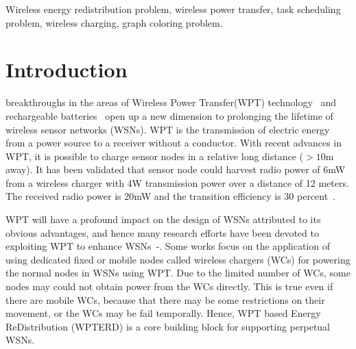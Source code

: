 \documentclass[journal,10pt]{IEEEtran}
\begin{document}
\begin{IEEEkeywords}
Wireless energy redistribution problem, wireless power transfer, task scheduling problem, wireless charging, graph coloring problem.
\end{IEEEkeywords}


\IEEEpeerreviewmaketitle



\section{Introduction}
\label{sec_intro}
\newtheorem{lemma}{\textbf{Lemma}}
\newtheorem{theorem}{\textbf{Theorem}}
\newtheorem{property}{\textbf{P}}
\newtheorem{corollary}{\textbf{Corollary}}
%
%
%
%

 breakthroughs in the areas of Wireless Power Transfer(WPT) technology~\cite{Kurs2007, Cannon2009} and rechargeable batteries~\cite{Kang2006} open up a new dimension to prolonging the lifetime of wireless sensor networks (WSNs). WPT is the transmission of electric energy from a power source to a receiver without a conductor. With recent advances in WPT, it is possible to charge sensor nodes in a relative long distance (${>}10$m away)\cite{Guo2017}. It has been validated that sensor node could harvest radio power of 6mW from a wireless charger with 4W transmission power over a distance of 12 meters. The received radio power is 20mW and the transition efficiency is 30 percent~\cite{Nintana2012}.

WPT will have a profound impact on the design of WSNs attributed to its obvious advantages, and hence many research efforts have been devoted to exploiting WPT to enhance WSNs~\cite{Xiang2013}-\cite{Madhja2017}. Some works focus on the application of using dedicated fixed or mobile nodes called wireless chargers (WCs) for powering the normal nodes in WSNs using WPT. Due to the limited number of WCs, some nodes may could not obtain power from the WCs directly. This is true even if there are mobile WCs, because that there may be some restrictions on their movement, or the WCs may be fail temporally. Hence, WPT based Energy ReDistribution (WPTERD) is a core building block for supporting perpetual WSNs.
\end{document}
